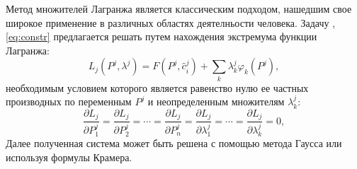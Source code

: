 %

Метод множителей Лагранжа является классическим подходом, нашедшим свое широкое применение в различных областях деятелньости человека. Задачу \label{track_fit}, \eqref{eq:constr} предлагается решать путем нахождения экстремума функции Лагранжа:
\begin{equation}
 \label{lagr}
 L_j(P^j, \lambda^j) = F(P^j, \hat{c}_i^j) + \sum_k \lambda^j_k \varphi_k(P^j),
\end{equation}
необходимым условием которого является равенство нулю ее частных производных по переменным $P^j$ и неопределенным множителям $\lambda^j_k$:
\[\frac{\partial L_j}{\partial P^j_1} = \frac{\partial L_j}{\partial P^j_2} = \cdots = \frac{\partial L_j}{\partial P^j_n} = \frac{\partial L_j}{\partial \lambda^j_1} = \cdots = \frac{\partial L_j}{\partial \lambda^j_k} = 0,\]
Далее полученная система может быть решена с помощью метода Гаусса или используя формулы Крамера.

